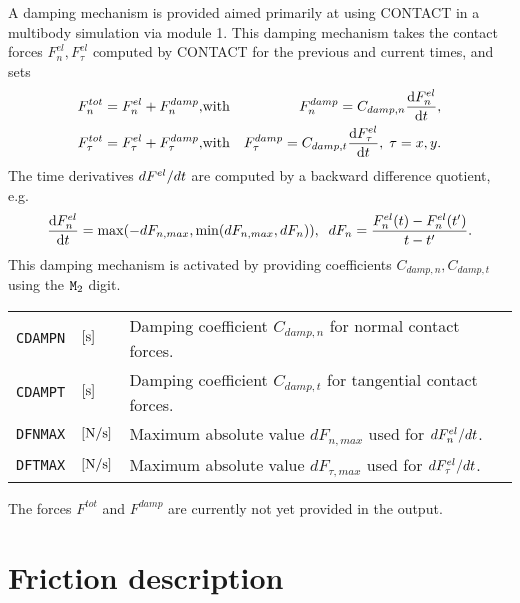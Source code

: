 \documentclass[12pt]{report}
\newenvironment{inputvars}{\vspace{0.4\baselineskip}%

\begin{tabular}{>{\raggedright}p{22mm}p{19mm}p{113mm}}}{
\end{tabular}

}
\newcommand{\inpvar}[3]{{\small\tt #1} & $#2$ & #3 \\[1ex]}
\begin{document}
A damping mechanism is provided aimed primarily at using CONTACT in a
multibody simulation via module 1. This damping mechanism takes the contact
forces $F_n^{el}, F_\tau^{el}$ computed by CONTACT for the previous and
current times, and sets
\begin{eqnarray}
  F_n^{tot} = F_n^{el} + F_n^{damp}, &\mbox{with}&
        F_n^{damp} = C_{damp,n} \frac{{\rm d} F_n^{el}}{{\rm d} t} , \\
  F_\tau^{tot} = F_\tau^{el} + F_\tau^{damp}, &\mbox{with}&
        F_\tau^{damp} = C_{damp,t} \frac{{\rm d} F_\tau^{el}}{{\rm d} t} , \; \tau=x,y .
\end{eqnarray}
The time derivatives $d F^{el}/d t$ are computed by a backward
difference quotient, e.g.\
\begin{equation}
        \frac{{\rm d} F_n^{el}}{{\rm d} t} = \max( -dF_{n,max}, \min( dF_{n,max}, dF_n )),
        \;\; dF_n = \frac{F_n^{el}(t)-F_n^{el}(t')}{t-t'} .
\end{equation}
This damping mechanism is activated by providing coefficients $C_{damp,n},
C_{damp,t}$ using the ${\tt M}_2$ digit. 
\begin{inputvars}
\inpvar{CDAMPN}{\bunit{s}}{Damping coefficient $C_{damp,n}$ for normal
        contact forces.}
\inpvar{CDAMPT}{\bunit{s}}{Damping coefficient $C_{damp,t}$ for tangential
        contact forces.}
\inpvar{DFNMAX}{\bunit{N/s}}{Maximum absolute value $dF_{n,max}$ used for
        $d F_n^{el}/d t$.}
\inpvar{DFTMAX}{\bunit{N/s}}{Maximum absolute value $dF_{\tau,max}$ used
        for $d F_\tau^{el}/d t$.}
\end{inputvars}
The forces $F^{tot}$ and $F^{damp}$ are currently not yet provided in the
output.

\section{Friction description}
\label{sec:fric_dscrp}
\end{document}
